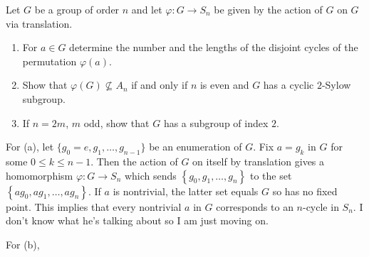 \begin{problem}
  Let \(G\) be a group of order \(n\) and let \(\varphi\colon G\to S_n\) be
  given by the action of \(G\) on \(G\) via translation.
  \begin{enumerate}[label=(\alph*),noitemsep]
  \item For \(a\in G\) determine the number and the lengths of the disjoint
    cycles of the permutation \(\varphi(a)\).
  \item Show that \(\varphi(G)\nsubseteq A_n\) if and only if \(n\) is even
    and \(G\) has a cyclic \(2\)-Sylow subgroup.
  \item If \(n=2m\), \(m\) odd, show that \(G\) has a subgroup of index
    \(2\).
  \end{enumerate}
\end{problem}
\begin{solution}
  For (a), let \(\{g_0=e,g_1,\dotsc,g_{n-1}\}\) be an enumeration of
  \(G\). Fix \(a=g_k\) in \(G\) for some \(0\leq k\leq n-1\). Then the
  action of \(G\) on itself by translation gives a homomorphism
  \(\varphi\colon G\to S_n\) which sends
  \(\left\{g_0,g_1,\dotsc,g_n\right\}\) to the set
  \(\left\{ag_0,ag_1,\dotsc,ag_n\right\}\). If \(a\) is nontrivial, the
  latter set equals \(G\) so has no fixed point. This implies that every
  nontrivial \(a\) in \(G\) corresponds to an \(n\)-cycle in \(S_n\). I
  don't know what he's talking about so I am just moving on.

  For (b),
\end{solution}

